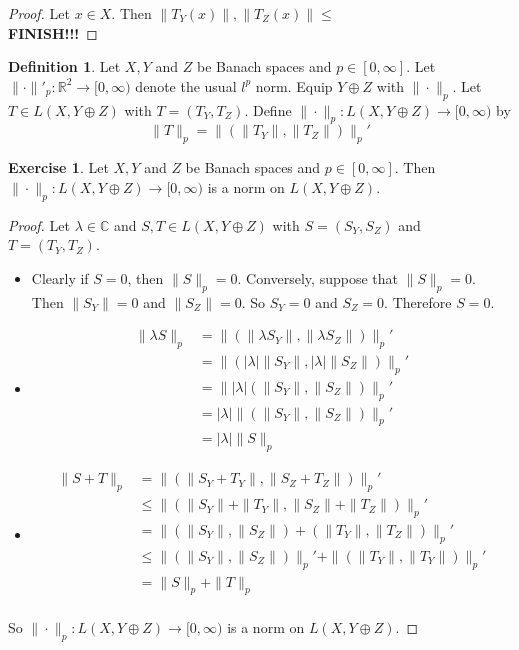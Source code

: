 \documentclass[12pt]{amsart}
\theoremstyle{definition}
\newtheorem{defn}[definition]{Definition}
\newtheorem{ex}[definition]{Exercise}
\newcommand{\lam}{\lambda}
\newcommand{\C}{\mathbb{C}}
\newcommand{\R}{\mathbb{R}}
\newcommand{\tbf}[1]{\textbf{#1}}
\newcommand{\Rg}{[0,\infty)}
\DeclareMathOperator*{\0}{\mbf{0}}
\DeclareMathOperator*{\1}{\mbf{1}}
\begin{document}
	\begin{proof}
	Let $x \in X$. Then $\|T_Y(x)\|, \|T_Z(x)\| \leq $
	\\ \tbf{FINISH!!!}
	\end{proof}

	\begin{defn}
	Let $X, Y$ and $Z$ be Banach spaces and $p \in [0, \infty]$. Let $\| \cdot \|'_p: \R^2 \rightarrow [0, \infty)$ denote the usual $l^p$ norm. Equip $Y \oplus Z$ with $\|\cdot\|_p$. Let $T \in L(X, Y \oplus Z)$ with $T = (T_Y, T_Z)$. Define $\|\cdot \|_p: L(X, Y \oplus Z) \rightarrow \Rg$ by $$\|T\|_p = \|(\|T_Y\|, \|T_Z\|)\|_p'$$
	\end{defn}
	
	\begin{ex}
	Let $X, Y$ and $Z$ be Banach spaces and $p \in [0, \infty]$. Then $\|\cdot \|_p: L(X, Y \oplus Z) \rightarrow \Rg$ is a norm on $L(X, Y \oplus Z)$. 
	\end{ex}
	
	\begin{proof}
	Let $\lam \in \C$ and $S, T \in L(X, Y \oplus Z)$ with $S= (S_Y, S_Z)$ and $T = (T_Y, T_Z)$. 
	\begin{itemize}
	\item Clearly if $S = 0$, then $\|S\|_p = 0$. Conversely, suppose that $\|S\|_p = 0$. Then $\|S_Y\| = 0$ and $\|S_Z\| = 0$. So $S_Y = 0$ and $S_Z = 0$. Therefore $S = 0$. 
	\item 
	\begin{align*}
	\|\lam S\|_p
	&= \|(\|\lam S_Y\|, \|\lam S_Z\|)\|_p' \\
	&= \|(|\lam|\| S_Y\|, |\lam|\|S_Z \|)\|_p' \\
	&= \||\lam| (\| S_Y\|,\|S_Z\| )\|_p' \\
	&= |\lam| \|(\| S_Y\|,\|S_Z\|)\|_p' \\
	&= |\lam| \| S\|_p
	\end{align*}
	\item 
	\begin{align*}
	\|S + T\|_p
	&= \|(\|S_Y + T_Y\|, \|S_Z + T_Z\|)\|_p' \\
	&\leq \|(\|S_Y\| + \|T_Y\|, \|S_Z\| + \|T_Z\|)\|_p' \\
	&= \|(\|S_Y\|, \|S_Z\|) + (\|T_Y\|, \|T_Z\|)\|_p' \\
	&\leq \|(\|S_Y\|, \|S_Z\|)\|_p' + \|(\|T_Y\|, \|T_Y\|)\|_p' \\
	&= \|S\|_p + \|T\|_p \\ 
	\end{align*}
	\end{itemize}
	So $\|\cdot \|_p: L(X, Y \oplus Z) \rightarrow \Rg$ is a norm on $L(X, Y \oplus Z)$. 
	\end{proof}
	
\end{document}
